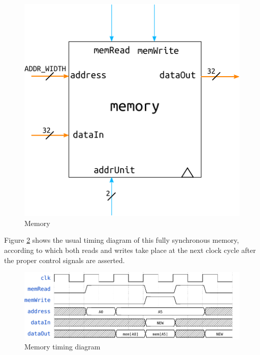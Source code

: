 \documentclass[a4paper]{article}
\begin{document}
\begin{figure}[hbtp]
    \centering
    \includegraphics[scale=1]{../memory/ref/schematic/memory.pdf}
    \caption{Memory}
    \label{fig:memory}
\end{figure}

Figure \ref{fig:memory_timing} shows the usual timing diagram of this fully synchronous memory, according to which both reads and writes take place at the next clock cycle after the proper control signals are asserted.

\begin{figure}[hbtp]
    \centering
    \includegraphics[scale=.8]{../memory/ref/timing/memory_timing.pdf}
    \caption{Memory timing diagram}
    \label{fig:memory_timing}
\end{figure}
\end{document}
